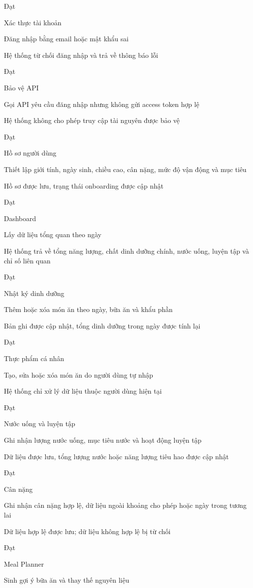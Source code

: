 \documentclass[12pt, a4paper]{report}
\begin{document}
Đạt

Xác thực tài khoản

Đăng nhập bằng email hoặc mật khẩu sai

Hệ thống từ chối đăng nhập và trả về thông báo lỗi

Đạt

Bảo vệ API

Gọi API yêu cầu đăng nhập nhưng không gửi access token hợp lệ

Hệ thống không cho phép truy cập tài nguyên được bảo vệ

Đạt

Hồ sơ người dùng

Thiết lập giới tính, ngày sinh, chiều cao, cân nặng, mức độ vận động và mục tiêu

Hồ sơ được lưu, trạng thái onboarding được cập nhật

Đạt

Dashboard

Lấy dữ liệu tổng quan theo ngày

Hệ thống trả về tổng năng lượng, chất dinh dưỡng chính, nước uống, luyện tập và chỉ số liên quan

Đạt

Nhật ký dinh dưỡng

Thêm hoặc xóa món ăn theo ngày, bữa ăn và khẩu phần

Bản ghi được cập nhật, tổng dinh dưỡng trong ngày được tính lại

Đạt

Thực phẩm cá nhân

Tạo, sửa hoặc xóa món ăn do người dùng tự nhập

Hệ thống chỉ xử lý dữ liệu thuộc người dùng hiện tại

Đạt

Nước uống và luyện tập

Ghi nhận lượng nước uống, mục tiêu nước và hoạt động luyện tập

Dữ liệu được lưu, tổng lượng nước hoặc năng lượng tiêu hao được cập nhật

Đạt

Cân nặng

Ghi nhận cân nặng hợp lệ, dữ liệu ngoài khoảng cho phép hoặc ngày trong tương lai

Dữ liệu hợp lệ được lưu; dữ liệu không hợp lệ bị từ chối

Đạt

Meal Planner

Sinh gợi ý bữa ăn và thay thế nguyên liệu
\end{document}
